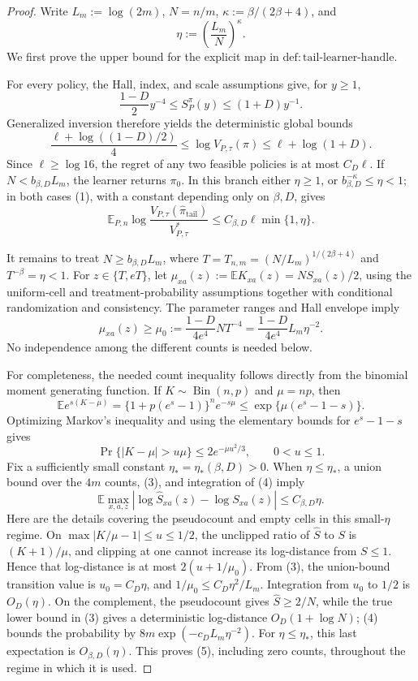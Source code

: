 \documentclass{article}
\begin{document}
\begin{proof}
Write \(L_m:=\log(2m)\), \(N=n/m\), \(\kappa:=\beta/(2\beta+4)\), and
\[
\eta:=\left(\frac{L_m}{N}\right)^\kappa.
\]
We first prove the upper bound for the explicit map in \(\mathrm{def{:}tail\text{-}learner\text{-}handle}\).

For every policy, the Hall, index, and scale assumptions give, for \(y\geq1\),
\[
\frac{1-D}{2}y^{-4}\leq S_P^\pi(y)\leq(1+D)y^{-1}.
\]
Generalized inversion therefore yields the deterministic global bounds
\[
\frac{\ell+\log((1-D)/2)}4
\leq\log V_{P,\tau}(\pi)
\leq\ell+\log(1+D).                                                       \tag{1}
\]
Since \(\ell\geq\log16\), the regret of any two feasible policies is at most \(C_D\ell\).  If \(N<b_{\beta,D}L_m\), the learner returns \(\pi_0\).  In this branch either \(\eta\geq1\), or \(b_{\beta,D}^{-\kappa}\leq\eta<1\); in both cases (1), with a constant depending only on \(\beta,D\), gives
\[
\mathbb E_{P,n}\log\frac{V_{P,\tau}(\widehat\pi_{\mathrm{tail}})}{V^*_{P,\tau}}
\leq C_{\beta,D}\ell\min\{1,\eta\}.                                   \tag{2}
\]

It remains to treat \(N\geq b_{\beta,D}L_m\), where \(T=T_{n,m}=(N/L_m)^{1/(2\beta+4)}\) and \(T^{-\beta}=\eta<1\).  For \(z\in\{T,eT\}\), let \(\mu_{xa}(z):=\mathbb E K_{xa}(z)=NS_{xa}(z)/2\), using the uniform-cell and treatment-probability assumptions together with conditional randomization and consistency.  The parameter ranges and Hall envelope imply
\[
\mu_{xa}(z)\geq \mu_0:=\frac{1-D}{4e^4}NT^{-4}
=\frac{1-D}{4e^4}L_m\eta^{-2}.                                          \tag{3}
\]
No independence among the different counts is needed below.

For completeness, the needed count inequality follows directly from the binomial moment generating function.  If \(K\sim\operatorname{Bin}(n,p)\) and \(\mu=np\), then
\[
\mathbb E e^{s(K-\mu)}
=\{1+p(e^s-1)\}^n e^{-s\mu}
\leq\exp\{\mu(e^s-1-s)\}.
\]
Optimizing Markov's inequality and using the elementary bounds for \(e^s-1-s\) gives
\[
\Pr\{|K-\mu|>u\mu\}\leq2e^{-\mu u^2/3},\qquad 0<u\leq1.               \tag{4}
\]
Fix a sufficiently small constant \(\eta_*=\eta_*(\beta,D)>0\).  When \(\eta\leq\eta_*\), a union bound over the \(4m\) counts, (3), and integration of (4) imply
\[
\mathbb E\max_{x,a,z}
\left|\log\widehat S_{xa}(z)-\log S_{xa}(z)\right|
\leq C_{\beta,D}\eta.                                                    \tag{5}
\]
Here are the details covering the pseudocount and empty cells in this small-\(\eta\) regime.  On
\(\max|K/\mu-1|\leq u\leq1/2\), the unclipped ratio of \(\widehat S\) to \(S\) is \((K+1)/\mu\), and clipping at one cannot increase its log-distance from \(S\leq1\).  Hence that log-distance is at most \(2(u+1/\mu_0)\).  From (3), the union-bound transition value is \(u_0=C_D\eta\), and \(1/\mu_0\leq C_D\eta^2/L_m\).  Integration from \(u_0\) to \(1/2\) is \(O_D(\eta)\).  On the complement, the pseudocount gives \(\widehat S\geq2/N\), while the true lower bound in (3) gives a deterministic log-distance \(O_D(1+\log N)\); (4) bounds the probability by \(8m\exp(-c_D L_m\eta^{-2})\).  For \(\eta\leq\eta_*\), this last expectation is \(O_{\beta,D}(\eta)\).  This proves (5), including zero counts, throughout the regime in which it is used.


\end{proof}
\end{document}
